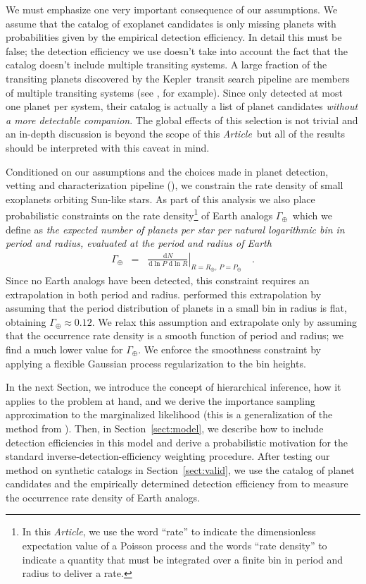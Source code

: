 \documentclass[12pt,preprint]{aastex}
\newcommand{\project}[1]{{\sffamily #1}}
\newcommand{\kepler}{\project{Kepler}}
\newcommand{\paper}{\textsl{Article}}
\newcommand{\Sect}[1]{Section~\ref{sect:#1}}
\newcommand{\sect}[1]{\Sect{#1}}
\newcommand{\dd}{\ensuremath{\,\mathrm{d}}}
\newcommand{\rate}{\ensuremath{\Gamma}}
\newcommand{\radius}{\ensuremath{R}}
\newcommand{\period}{\ensuremath{P}}
\newcommand{\gammaearth}{{\ensuremath{\rate_\oplus}}}
\begin{document}
We must emphasize one very important consequence of our assumptions.
We assume that the catalog of exoplanet candidates is only missing planets
with probabilities given by the empirical detection efficiency.
In detail this must be false; the detection efficiency we use
doesn't take into account the fact that the catalog doesn't include multiple
transiting systems.
A large fraction of the transiting planets discovered by the \kepler\ transit
search pipeline are members of multiple transiting systems (see
\citealt{lissauer}, for example).
Since \citet{petigura} only detected at most one planet per system, their
catalog is actually a list of planet candidates \emph{without a more
detectable companion}.
The global effects of this selection is not trivial and an in-depth discussion
is beyond the scope of this \paper\ but all of the results should be
interpreted with this caveat in mind.

Conditioned on our assumptions and the choices made in planet detection,
vetting and characterization pipeline (\citealt{petigura-a, petigura}), we
constrain the rate density of small exoplanets orbiting Sun-like stars.
As part of this analysis we also place probabilistic constraints on the rate
density\footnote{In this \paper, we use the word ``rate'' to indicate the
dimensionless expectation value of a Poisson process and the words ``rate
density'' to indicate a quantity that must be integrated over a finite bin in
period and radius to deliver a rate.} of Earth analogs \gammaearth\ which we
define as \emph{the expected number of planets per star per natural
logarithmic bin in period and radius, evaluated at the period and radius of
Earth}
\begin{eqnarray}
\gammaearth &=&
\left.\frac{\dd N}{\dd\ln\period\,\dd\ln\radius}\right|
_{\radius=\radius_\oplus,\,\period=\period_\oplus}\quad.
\end{eqnarray}
Since no Earth analogs have been detected, this constraint requires an
extrapolation in both period and radius.
\citet{petigura} performed this extrapolation by assuming that the period
distribution of planets in a small bin in radius is flat, obtaining
$\gammaearth \approx 0.12$.
We relax this assumption and extrapolate only by assuming that the occurrence
rate density is a smooth function of period and radius; we find a much lower
value for \gammaearth.
We enforce the smoothness constraint by applying a flexible Gaussian process
regularization to the bin heights.

In the next Section, we introduce the concept of hierarchical inference, how
it applies to the problem at hand, and we derive the importance sampling
approximation to the marginalized likelihood (this is a generalization of the
method from \citealt{hogge}).
Then, in \sect{model}, we describe how to include detection efficiencies in
this model and derive a probabilistic motivation for the standard
inverse-detection-efficiency weighting procedure.
After testing our method on synthetic catalogs in \sect{valid}, we use the
catalog of planet candidates and the empirically determined detection
efficiency from \citet{petigura} to measure the occurrence rate density of
Earth analogs.
\end{document}
